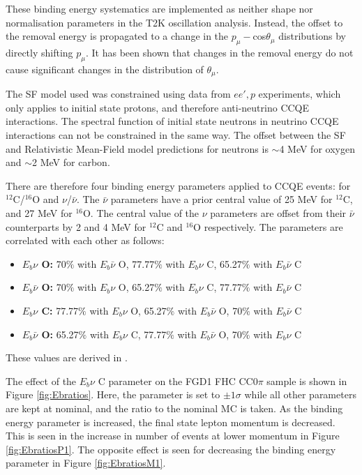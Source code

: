These binding energy systematics are implemented as neither shape nor normalisation parameters in the T2K oscillation analysis. Instead, the offset to the removal energy is propagated to a change in the $p_{\mu}-$cos$\theta_{\mu}$ distributions by directly shifting $p_{\mu}$. It has been shown that changes in the removal energy do not cause significant changes in the distribution of $\theta_{\mu}$\cite{tn344}.

The SF model used was constrained using data from $ee',p$ experiments, which only applies to initial state protons, and therefore anti-neutrino CCQE interactions. The spectral function of initial state neutrons in neutrino CCQE interactions can not be constrained in the same way. The offset between the SF and Relativistic Mean-Field model predictions \cite{RMFPred} for neutrons is $\sim$4 MeV for oxygen and $\sim$2 MeV for carbon. 

There are therefore four binding energy parameters applied to CCQE events: for $^{12}$C/$^{16}$O and $\nu$/$\bar{\nu}$. The $\bar{\nu}$ parameters have a prior central value of 25 MeV for $^{12}$C, and 27 MeV for $^{16}$O. The central value of the $\nu$ parameters are offset from their $\bar{\nu}$ counterparts by 2 and 4 MeV for $^{12}$C and $^{16}$O respectively. The parameters are correlated with each other as follows:

\begin{itemize}

\item \textbf{$E_{b}\nu$ O:} 70$\%$ with $E_{b}\bar{\nu}$ O, 77.77$\%$ with $E_{b}\nu$ C, 65.27$\%$ with $E_{b}\bar{\nu}$ C

\item \textbf{$E_{b}\bar{\nu}$ O:} 70$\%$ with $E_{b}\nu$ O, 65.27$\%$ with $E_{b}\nu$ C, 77.77$\%$ with $E_{b}\bar{\nu}$ C

\item \textbf{$E_{b}\nu$ C:} 77.77$\%$ with $E_{b}\nu$ O, 65.27$\%$ with $E_{b}\bar{\nu}$ O, 70$\%$ with $E_{b}\bar{\nu}$ C

\item \textbf{$E_{b}\bar{\nu}$ O:} 65.27$\%$ with $E_{b}\nu$ C, 77.77$\%$ with $E_{b}\bar{\nu}$ O, 70$\%$ with $E_{b}\nu$ C

\end{itemize}

These values are derived in \cite{tn344}.

The effect of the $E_b \nu$ C parameter on the FGD1 FHC CC0$\pi$ sample is shown in Figure \ref{fig:Ebratios}. Here, the parameter is set to $\pm1\sigma$ while all other parameters are kept at nominal, and the ratio to the nominal MC is taken. As the binding energy parameter is increased, the final state lepton momentum is decreased. This is seen in the increase in number of events at lower momentum in Figure \ref{fig:EbratiosP1}. The opposite effect is seen for decreasing the binding energy parameter in Figure \ref{fig:EbratiosM1}.

